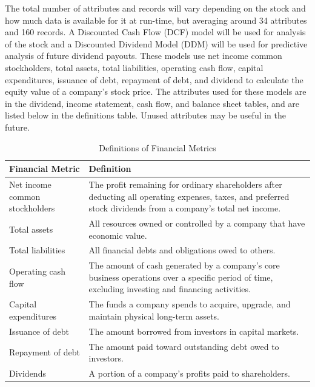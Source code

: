 \documentclass[runningheads]{llncs}
\begin{document}
The total number of attributes and records will vary depending on the stock and how much data is available for it at run-time, but averaging around 34 attributes and 160 records. A Discounted Cash Flow (DCF) model will be used for analysis of the stock and a Discounted Dividend Model (DDM) will be used for predictive analysis of future dividend payouts. These models use net income common stockholders, total assets, total liabilities, operating cash flow, capital expenditures, issuance of debt, repayment of debt, and dividend to calculate the equity value of a company's stock price. The attributes used for these models are in the dividend, income statement, cash flow, and balance sheet tables, and are listed below in the definitions table. Unused attributes may be useful in the future.

\begin{table}[ht]
\centering
\caption{Definitions of Financial Metrics}\label{tab:financial_metrics}
\begin{tabular}{p{4cm} p{8cm}}
\toprule
\textbf{Financial Metric} & \textbf{Definition} \\
\midrule
Net income common stockholders & The profit remaining for ordinary shareholders after deducting all operating expenses, taxes, and preferred stock dividends from a company's total net income. \\

Total assets & All resources owned or controlled by a company that have economic value. \\

Total liabilities & All financial debts and obligations owed to others. \\

Operating cash flow & The amount of cash generated by a company's core business operations over a specific period of time, excluding investing and financing activities. \\

Capital expenditures & The funds a company spends to acquire, upgrade, and maintain physical long-term assets. \\

Issuance of debt & The amount borrowed from investors in capital markets. \\

Repayment of debt & The amount paid toward outstanding debt owed to investors. \\

Dividends & A portion of a company's profits paid to shareholders. \\
\bottomrule
\end{tabular}
\end{table}
\end{document}
